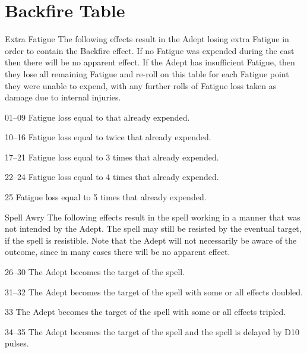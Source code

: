 \section{Backfire Table}
\label{tables:backfire}
\begin{multicols}{3}

\begin{Description}

\item[Extra Fatigue] The following effects result in the Adept losing
extra Fatigue in order to contain the Backfire effect.  If no Fatigue
was expended during the cast then there will be no apparent effect.
If the Adept has insufficient Fatigue, then they lose all remaining
Fatigue and re-roll on this table for each Fatigue point they were
unable to expend, with any further rolls of Fatigue loss taken as
damage due to internal injuries.

\item[01--09] Fatigue loss equal to that already expended.

\item[10--16] Fatigue loss equal to twice that already expended.

\item[17--21] Fatigue loss equal to 3 times that already expended.

\item[22--24] Fatigue loss equal to 4 times that already expended.

\item[25] Fatigue loss equal to 5 times that already expended.

\item[Spell Awry] The following effects result in the spell working in
a manner that was not intended by the Adept.  The spell may still be
resisted by the eventual target, if the spell is resistible.  Note
that the Adept will not necessarily be aware of the outcome, since in
many cases there will be no apparent effect.

\item[26--30] The Adept becomes the target of the spell.

\item[31--32] The Adept becomes the target of the spell with some or
all effects doubled.

\item[33] The Adept becomes the target of the spell with some or all
effects tripled.

\item[34--35] The Adept becomes the target of the spell and the spell
is delayed by D10 pulses.


\end{Description}
\end{multicols}
